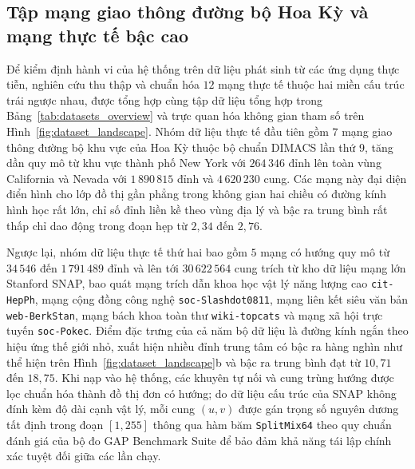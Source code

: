 \subsection{Tập mạng giao thông đường bộ Hoa Kỳ và mạng thực tế bậc cao}\label{subsec:c3-data-real}

Để kiểm định hành vi của hệ thống trên dữ liệu phát sinh từ các ứng dụng thực tiễn, nghiên cứu thu thập và chuẩn hóa $12$ mạng thực tế thuộc hai miền cấu trúc trái ngược nhau, được tổng hợp cùng tập dữ liệu tổng hợp trong Bảng~\ref{tab:datasets_overview} và trực quan hóa không gian tham số trên Hình~\ref{fig:dataset_landscape}. Nhóm dữ liệu thực tế đầu tiên gồm $7$ mạng giao thông đường bộ khu vực của Hoa Kỳ thuộc bộ chuẩn DIMACS lần thứ 9, tăng dần quy mô từ khu vực thành phố New York với $264\,346$ đỉnh lên toàn vùng California và Nevada với $1\,890\,815$ đỉnh và $4\,620\,230$ cung. Các mạng này đại diện điển hình cho lớp đồ thị gần phẳng trong không gian hai chiều có đường kính hình học rất lớn, chỉ số đỉnh liền kề theo vùng địa lý và bậc ra trung bình rất thấp chỉ dao động trong đoạn hẹp từ $2{,}34$ đến $2{,}76$.

Ngược lại, nhóm dữ liệu thực tế thứ hai bao gồm $5$ mạng có hướng quy mô từ $34\,546$ đến $1\,791\,489$ đỉnh và lên tới $30\,622\,564$ cung trích từ kho dữ liệu mạng lớn Stanford SNAP, bao quát mạng trích dẫn khoa học vật lý năng lượng cao \texttt{cit-HepPh}, mạng cộng đồng công nghệ \texttt{soc-Slashdot0811}, mạng liên kết siêu văn bản \texttt{web-BerkStan}, mạng bách khoa toàn thư \texttt{wiki-topcats} và mạng xã hội trực tuyến \texttt{soc-Pokec}. Điểm đặc trưng của cả năm bộ dữ liệu là đường kính ngắn theo hiệu ứng thế giới nhỏ, xuất hiện nhiều đỉnh trung tâm có bậc ra hàng nghìn như thể hiện trên Hình~\ref{fig:dataset_landscape}b và bậc ra trung bình đạt từ $10{,}71$ đến $18{,}75$. Khi nạp vào hệ thống, các khuyên tự nối và cung trùng hướng được lọc chuẩn hóa thành đồ thị đơn có hướng; do dữ liệu cấu trúc của SNAP không đính kèm độ dài cạnh vật lý, mỗi cung $(u, v)$ được gán trọng số nguyên dương tất định trong đoạn $[1, 255]$ thông qua hàm băm \texttt{SplitMix64} theo quy chuẩn đánh giá của bộ đo GAP Benchmark Suite để bảo đảm khả năng tái lập chính xác tuyệt đối giữa các lần chạy.

